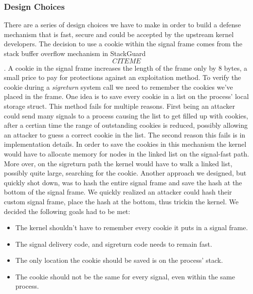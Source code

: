 \documentclass{sig-alternate-05-2015}
\begin{document}
\subsubsection{Design Choices}
There are a series of design choices we have to make in order to build a defense mechanism that is fast, secure and could be accepted by the upstream kernel developers. The decision to use a cookie within the signal frame comes from the stack buffer overflow mechanism in StackGuard \[CITE ME\]. A cookie in the signal frame increases the length of the frame only by 8 bytes, a small price to pay for protections against an exploitation method. To verify the cookie during a \textit{sigreturn} system call we need to remember the cookies we've placed in the frame. One idea is to save every cookie in a list on the process' local storage struct. This method fails for multiple reasons. First being an attacker could send many signals to a process causing the list to get filled up with cookies, after a certian time the range of outstanding cookies is reduced, possibly allowing an attacker to guess a correct cookie in the list. The second reason this fails is in implementation details. In order to save the cookies in this mechanism the kernel would have to allocate memory for nodes in the linked list on the signal-fast path. More over, on the sigreturn path the kernel would have to walk a linked list, possibly quite large, searching for the cookie. Another approach we designed, but quickly shot down, was to hash the entire signal frame and save the hash at the bottom of the signal frame. We quickly realized an attacker could hash their custom signal frame, place the hash at the bottom, thus trickin the kernel. We decided the following goals had to be met:\\
\begin{itemize}
  \item The kernel shouldn't have to remember every cookie it puts in a signal frame.
  \item The signal delivery code, and sigreturn code needs to remain fast.
  \item The only location the cookie should be saved is on the process' stack.
  \item The cookie should not be the same for every signal, even within the same process.
\end{itemize}
\end{document}
